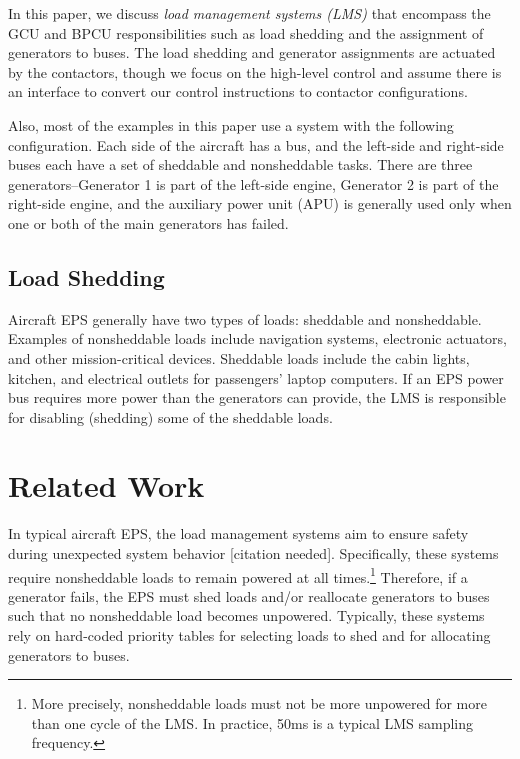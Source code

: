 \documentclass{acm_proc_article-sp}
\begin{document}
In this paper, we discuss \emph{load management systems (LMS)} that encompass the GCU and BPCU responsibilities such as load shedding and the assignment of generators to buses. 
The load shedding and generator assignments are actuated by the contactors, though we focus on the high-level control and assume there is an interface to convert our control instructions to contactor configurations.

Also, most of the examples in this paper use a system with the following configuration.
Each side of the aircraft has a bus, and the left-side and right-side buses each have a set of sheddable and nonsheddable tasks.
There are three generators--Generator 1 is part of the left-side engine, Generator 2 is part of the right-side engine, and the auxiliary power unit (APU) is generally used only when one or both of the main generators has failed.


\subsection{Load Shedding}
Aircraft EPS generally have two types of loads: sheddable and nonsheddable.
Examples of nonsheddable loads include navigation systems, electronic actuators, and other mission-critical devices.
Sheddable loads include the cabin lights, kitchen, and electrical outlets for passengers' laptop computers.
If an EPS power bus requires more power than the generators can provide, the LMS is responsible for disabling (shedding) some of the sheddable loads.

\section{Related Work}
\label{sec:related-work}
In typical aircraft EPS, the load management systems aim to ensure safety during unexpected system behavior [citation needed].
Specifically, these systems require nonsheddable loads to remain powered at all times.\footnote{More precisely, nonsheddable loads must not be more unpowered for more than one cycle of the LMS. In practice, 50ms is a typical LMS sampling frequency.} %
Therefore, if a generator fails, the EPS must shed loads and/or reallocate generators to buses such that no nonsheddable load becomes unpowered.
Typically, these systems rely on hard-coded priority tables for selecting loads to shed and for allocating generators to buses.
\end{document}
